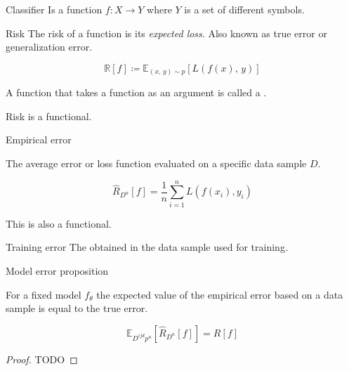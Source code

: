 \begin{definition}{Classifier}{}
	Is a function \(f: X \longrightarrow Y\)
	where \(Y\) is a set of different symbols.
\end{definition}

\begin{definition}{Risk}{}
	The risk of a function is its \emph{expected loss}. Also known as true
	error or generalization error.

	\begin{equation*}
		\mathds{R}[f] \coloneqq \mathds{E}_{(x,\, y) \sim p} \left[ L(f(x),\, y) \right]
	\end{equation*}

  \tcblower{}
	\begin{marker}
    A function that takes a function as an argument is called a .

    Risk is a functional.
	\end{marker}
\end{definition}

\begin{definition}{Empirical error}{}

	The average error or loss function evaluated on a specific data sample
	\(D\).

	\begin{equation*}
		\hat{R}_{D^n}[f] = \frac{1}{n} \sum_{i=1}^n L(f(x_i), y_i)
	\end{equation*}

  \tcblower{}
	\begin{note}
		This is also a functional.
	\end{note}
\end{definition}

\begin{definition}{Training error}{}
	The  obtained in the data
	sample used for training.
\end{definition}

\begin{prop}{Model error proposition}{}

	For a fixed model \(f_θ\) the expected value of the
	empirical error based on a data sample is equal to the true error.

	\begin{equation*}
		\mathds{E}_{D^{ijd}p^n}[\hat{R}_{D^n}[f]] = R[f]
	\end{equation*}

  \tcblower
	\begin{proof} TODO
	\end{proof}
\end{prop}


